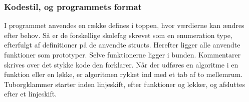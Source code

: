 \subsubsection{Kodestil, og programmets format}
I programmet anvendes en række defines i toppen, hvor værdierne kan ændres efter behov. Så er de forskellige skolefag skrevet som en enumeration type, efterfulgt af definitioner på de anvendte structs. Herefter ligger alle anvendte funktioner som prototyper. Selve funktionerne ligger i bunden. Kommentarer skrives over det stykke kode den forklarer. Når der udføres en algoritme i en funktion eller en løkke, er algoritmen rykket ind med et tab af to mellemrum. Tuborgklammer starter inden linjeskift, efter funktioner og løkker, og afsluttes efter et linjeskift. 